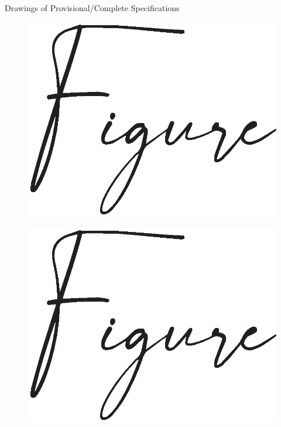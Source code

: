 \documentclass[10pt, a4paper]{article}
\begin{document}
	
	\begin{center}
			Drawings of Provisional/Complete Specifications
	\end{center}




	\begin{figure}[h!]
		\centering
		
			\includegraphics[scale=0.35]{figures/figure.eps}
		
		\caption{}
	\end{figure}




	\begin{figure}[h!]
		\centering
		
			\includegraphics[scale=0.35]{figures/figure.eps}
		
		\caption{}
	\end{figure}
\end{document}
